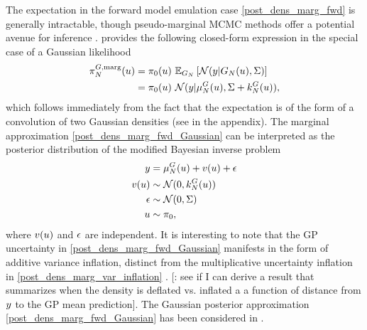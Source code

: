 \documentclass[12pt]{article}
\begin{document}
The expectation in the forward model emulation case 
\ref{post_dens_marg_fwd} is generally intractable, though pseudo-marginal MCMC methods offer a potential 
avenue for inference \cite{pseudoMarginalMCMC}.  provides the 
following closed-form expression in the special case of a Gaussian likelihood
\begin{align}
\fwdEmMargDens[\Ndesign](\Par) 
&= \priorDens(\Par) \ \E_{\fwdEm}\left[\Gaussian(\obs | \fwdEm[\Ndesign](\Par), \likPar) \right]
\nonumber \\
&= \priorDens(\Par) \ \Gaussian(\obs | \emMean[\Ndesign]{\fwd}(\Par), \likPar + \emKer[\Ndesign]{\fwd}(\Par)),
\label{post_dens_marg_fwd_Gaussian}
\end{align}
which follows immediately from the fact that the expectation is of the form of a convolution 
of two Gaussian densities (see  in the appendix). 
The marginal approximation \ref{post_dens_marg_fwd_Gaussian}
can be interpreted as the posterior distribution of the modified Bayesian inverse problem 
\begin{align}
\obs &= \emMean[\Ndesign]{\fwd}(\Par) + v(\Par) + \noise \label{inv_prob_Gaussian_marginal_approx} \\
v(\Par) &\sim \Gaussian(0, \emKer[\Ndesign]{\fwd}(\Par)) \nonumber \\
\noise &\sim \Gaussian(0, \likPar) \nonumber \\
\Par &\sim \priorDens \nonumber, 
\end{align}
where $v(\Par)$ and $\noise$ are independent. It is interesting to note that the GP uncertainty in 
\ref{post_dens_marg_fwd_Gaussian} manifests in the form of additive variance inflation, distinct 
from the multiplicative uncertainty inflation in \ref{post_dens_marg_var_inflation} \cite{GP_PDE_priors}.
[\todo: see if I can derive a result that summarizes when the density is deflated vs. inflated a a function 
of distance from $\obs$ to the GP mean prediction].  
The Gaussian posterior approximation \ref{post_dens_marg_fwd_Gaussian} has been considered in 
\cite{StuartTeck2, hydrologicalModel, GP_PDE_priors, GP_PDE_priors, CES, idealizedGCM, weightedIVAR}. 
\end{document}
